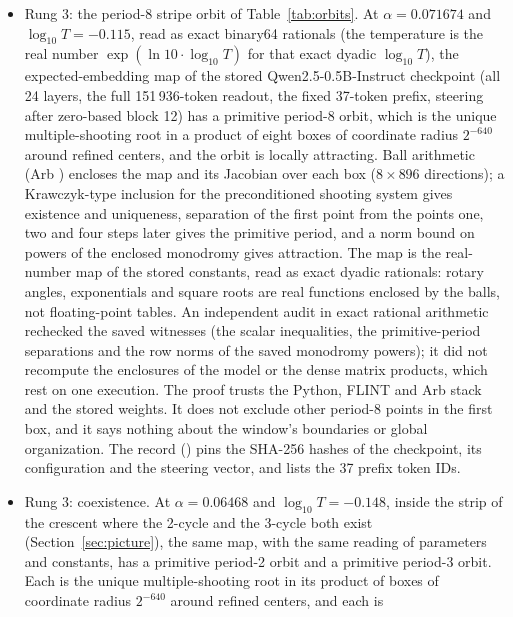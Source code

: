 \documentclass[11pt,letterpaper]{article}
\begin{document}
\begin{itemize}
\item Rung 3: the period-8 stripe orbit of Table~\ref{tab:orbits}. At $\alpha=0.071674$ and $\log_{10}T=-0.115$,
  read as exact binary64 rationals (the temperature is the real number $\exp(\ln 10\cdot\log_{10}T)$ for that exact
  dyadic $\log_{10}T$), the expected-embedding map of the stored Qwen2.5-0.5B-Instruct checkpoint (all 24 layers, the
  full 151\,936-token readout, the fixed 37-token prefix, steering after zero-based block 12) has a primitive
  period-8 orbit, which is the unique multiple-shooting root in a product of eight boxes of coordinate radius
  $2^{-640}$ around refined centers, and the orbit is locally attracting. Ball arithmetic (Arb
  \cite{johansson2017arb}) encloses the map and its Jacobian over each box ($8\times896$ directions); a Krawczyk-type
  inclusion \cite{krawczyk1969newton,moore2009interval,rump2010verification} for the preconditioned shooting system gives existence and uniqueness, separation of the first point
  from the points one, two and four steps later gives the primitive period, and a norm bound on powers of the
  enclosed monodromy gives attraction. The map is the real-number map of the stored constants, read as exact
  dyadic rationals: rotary angles, exponentials and square roots are real functions enclosed by the balls, not
  floating-point tables. An independent audit in exact rational arithmetic rechecked the saved witnesses (the
  scalar inequalities, the primitive-period separations and the row norms of the saved monodromy powers); it did
  not recompute the enclosures of the model or the dense matrix products, which rest on one execution. The proof
  trusts the Python, FLINT and Arb stack and the stored weights. It does not exclude other period-8 points in the
  first box, and it says nothing about the window's boundaries or global organization. The record
  () pins the SHA-256 hashes of the checkpoint, its
  configuration and the steering vector, and lists the 37 prefix token IDs.
\item Rung 3: coexistence. At $\alpha=0.06468$ and $\log_{10}T=-0.148$, inside the strip of the crescent where the
  2-cycle and the 3-cycle both exist (Section~\ref{sec:picture}), the same map, with the same reading of
  parameters and constants, has a primitive period-2 orbit and a primitive period-3 orbit. Each is the unique
  multiple-shooting root in its product of boxes of coordinate radius $2^{-640}$ around refined centers, and each is

\end{itemize}
\end{document}
